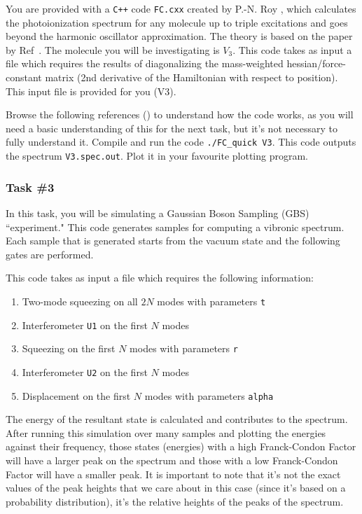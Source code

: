 \documentclass[12pt]{article}
\begin{document}
You are provided with a \texttt{C++} code \texttt{FC.cxx} created by P.-N. Roy \cite{yang1995structure}, which calculates the photoionization spectrum for any molecule up to triple excitations and goes beyond the harmonic oscillator approximation. The theory is based on the paper by Ref~\cite{doktorov1977dynamical}. The molecule you will be investigating is $V_3$.
This code takes as input a file which requires the results of diagonalizing the mass-weighted hessian/force-constant matrix (2nd derivative of the Hamiltonian with respect to position). This input file is provided for you (V3).

Browse the following references (\cite{yang1995structure,doktorov1977dynamical,quesadaFranckCondonFactorsCounting2019}) to understand how the code works, as you will need a basic understanding of this for the next task, but it's not necessary to fully understand it.  Compile and run the code \texttt{./FC\_quick V3}. This code outputs the spectrum \texttt{V3.spec.out}. Plot it in your favourite plotting program. 

\subsubsection*{Task \#3}

In this task, you will be simulating a Gaussian Boson Sampling (GBS) ``experiment." This code generates samples for computing a vibronic spectrum. Each sample that is generated starts from the vacuum state and the following gates are performed\cite{killoran2019strawberry, bromley2020applications}.

\noindent This code takes as input a file which requires the following information:
\begin{enumerate}
\item Two-mode squeezing on all  $2N$  modes with parameters \texttt{t}
\item Interferometer \texttt{U1} on the first $ N$ modes
\item Squeezing on the first $N$ modes with parameters \texttt{r}
\item Interferometer \texttt{U2} on the first  $N$ modes
\item Displacement on the first  $N$ modes with parameters \texttt{alpha}
\end{enumerate}

The energy of the resultant state is calculated and contributes to the spectrum. After running this simulation over many samples and plotting the energies against their frequency, those states (energies) with a high Franck-Condon Factor will have a larger peak on the spectrum and those with a low Franck-Condon Factor will have a smaller peak. It is important to note that it's not the exact values of the peak heights that we care about in this case (since it's based on a probability distribution), it's the relative heights of the peaks of the spectrum.
\end{document}
